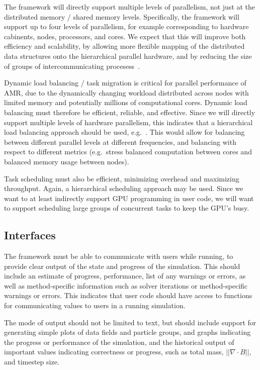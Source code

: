 \documentclass{article}
\begin{document}
The framework will directly support multiple levels of parallelism,
not just at the distributed memory / shared memory levels.
Specifically, the framework will support up to four levels of
parallelism, for example corresponding to hardware cabinents, nodes,
processors, and cores.  We expect that this will improve both
efficiency and scalability, by allowing more flexible mapping of the
distributed data structures onto the hierarchical parallel hardware,
and by reducing the size of groups of intercommunicating
procesess~\cite{BaBu09}.

Dynamic load balancing / task migration is critical for parallel
performance of AMR, due to the dynamically changing workload
distributed across nodes with limited memory and potentially millions
of computational cores.  Dynamic load balancing must therefore be
efficient, reliable, and effective.  Since we will directly support
multiple levels of hardware parallelism, this indicates that a
hierarchical load balancing approach should be used,
e.g.~\cite{LaTa06}.  This would allow for balancing between different
parallel levels at different frequencies, and balancing with respect
to different metrics (e.g.~stress balanced computation between cores
and balanced memory usage between nodes).

Task scheduling must also be efficient, minimizing overhead and
maximizing throughput.  Again, a hierarchical scheduling approach may
be used.  Since we want to at least indirectly support GPU programming
in user code, we will want to support scheduling large groups of
concurrent tasks to keep the GPU's busy.

  
\subsection{Interfaces}

The framework must be able to communicate with users while running, to
provide clear output of the state and progress of the simulation.
This should include an estimate of progress, performance, list of any
warnings or errors, as well as method-specific information such as
solver iterations or method-specific warnings or errors.  This
indicates that user code should have access to functions for
communicating values to users in a running simulation.

The mode of output should not be limited to text, but should include
support for generating simple plots of data fields and particle
groups, and graphs indicating the progress or performance of the
simulation, and the historical output of important values indicating
correctness or progress, such as total mass, $||\nabla \cdot B||$, and
timestep size.
\end{document}
